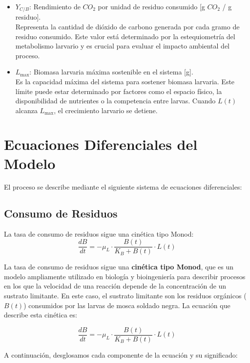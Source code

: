 \documentclass[12pt]{article}
\begin{document}
\begin{itemize}
    \item $Y_{C/B}$: Rendimiento de $CO_2$ por unidad de residuo consumido [g $CO_2$ / g residuo]. \\
    Representa la cantidad de dióxido de carbono generada por cada gramo de residuo consumido. Este valor está determinado por la estequiometría del metabolismo larvario y es crucial para evaluar el impacto ambiental del proceso.

    \item $L_{\text{max}}$: Biomasa larvaria máxima sostenible en el sistema [g]. \\
    Es la capacidad máxima del sistema para sostener biomasa larvaria. Este límite puede estar determinado por factores como el espacio físico, la disponibilidad de nutrientes o la competencia entre larvas. Cuando $L(t)$ alcanza $L_{\text{max}}$, el crecimiento larvario se detiene.
\end{itemize}

\section{Ecuaciones Diferenciales del Modelo}
El proceso se describe mediante el siguiente sistema de ecuaciones diferenciales:

\subsection{Consumo de Residuos}
La tasa de consumo de residuos sigue una cinética tipo Monod:
\begin{equation}
    \frac{dB}{dt} = -\mu_L \cdot \frac{B(t)}{K_B + B(t)} \cdot L(t)
\end{equation}


La tasa de consumo de residuos sigue una \textbf{cinética tipo Monod}, que es un modelo ampliamente utilizado en biología y bioingeniería para describir procesos en los que la velocidad de una reacción depende de la concentración de un sustrato limitante. En este caso, el sustrato limitante son los residuos orgánicos ($B(t)$) consumidos por las larvas de mosca soldado negra. La ecuación que describe esta cinética es:

\begin{equation}
    \frac{dB}{dt} = -\mu_L \cdot \frac{B(t)}{K_B + B(t)} \cdot L(t)
\end{equation}

A continuación, desglosamos cada componente de la ecuación y su significado:
\end{document}
